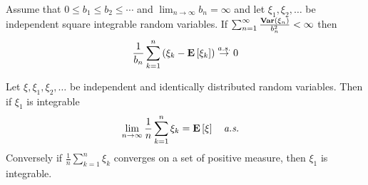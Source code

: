 \begin{cor}\label{KolmogorovSLLNL2}Assume that $0 \leq b_1 \leq b_2 \leq \cdots$ and $\lim_{n
    \to \infty} b_n = \infty$ and let $\xi_1, \xi_2, \dots$ be
    independent square integrable random variables.  If
    $\sum_{n=1}^\infty \frac{\textbf{Var} \left (\xi_n \right )}{b_n^2} < \infty$ then 
\begin{align*}
\frac{1}{b_n} \sum_{k=1}^n \left( \xi_k - \textbf{E}\left[\xi_k\right] \right )
\overset{a.s.}\to 0
\end{align*}
\end{cor}

\begin{thm}\label{SLLN} Let $\xi, \xi_1, \xi_2, \dots$ be independent and identically
  distributed random variables. Then if $\xi_1$ is integrable
\begin{align*}
\lim_{n \to \infty} \frac{1}{n} \sum_{k=1}^n \xi_k &= \textbf{E}\left[\xi\right] \quad \text{\emph{a.s.}}
\end{align*}
Conversely if $\frac{1}{n} \sum_{k=1}^n \xi_k$ converges on a set of
positive measure, then $\xi_1$ is integrable.
\end{thm}
